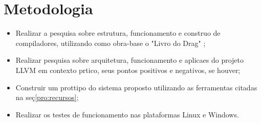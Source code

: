 \section{Metodologia}

\label{pro:metodologia}

\begin{itemize}
  \item Realizar a pesquisa sobre estrutura, funcionamento e constru\ca o de compiladores, utilizando como obra-base o "Livro do Drag\ao" \cite{Aho08};
  \item Realizar pesquisa sobre arquitetura, funcionamento e aplica\co es do projeto LLVM em contexto pr\ah tico, seus pontos positivos e negativos, se houver;
  \item Construir um prot\oh tipo do sistema proposto utilizando as ferramentas citadas na se\c{c}\ao \ref{pro:recursos};
  \item Realizar os testes de funcionamento nas plataformas Linux e Windows.
\end{itemize}
